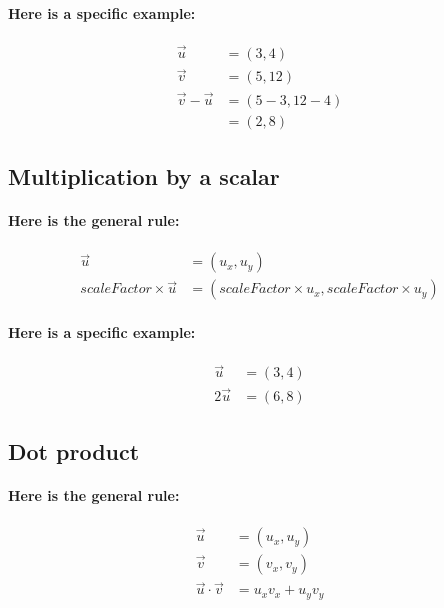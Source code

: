 \documentclass[twoside]{article}
\begin{document}
\paragraph{Here is a specific example:}

\begin{align*}
  \vec{u} & = (3, 4) \\
  \vec{v} & = (5, 12) \\
  \vec{v} - \vec{u} & = (5 - 3, 12 - 4) \\
                          & = (2, 8)
  \end{align*}

\subsection{Multiplication by a scalar}

\paragraph{Here is the general rule:}

\begin{align*}
  \vec{u} & = (u_x, u_y) \\
   scaleFactor \times \vec{u} & = (scaleFactor \times u_x, scaleFactor \times u_y)
  \end{align*}

\paragraph{Here is a specific example:}

\begin{align*}
  \vec{u} & = (3, 4) \\
  2 \vec{u} & = (6, 8)
  \end{align*}

\subsection{Dot product}

\paragraph{Here is the general rule:}

\begin{align*}
  \vec{u} & = (u_x, u_y) \\
  \vec{v} & = (v_x, v_y) \\
  \vec{u} \cdot \vec{v} & = u_x v_x + u_y v_y
  \end{align*}
\end{document}
